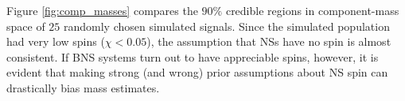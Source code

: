 Figure \ref{fig:comp_masses} compares the $90\%$ credible regions in component-mass space of $25$ randomly chosen simulated signals.  Since the simulated population had very low spins ($\chi < 0.05$), the assumption that NSs have no spin is almost consistent.  If BNS systems turn out to have appreciable spins, however, it is evident that making strong (and wrong) prior assumptions about NS spin can drastically bias mass estimates.